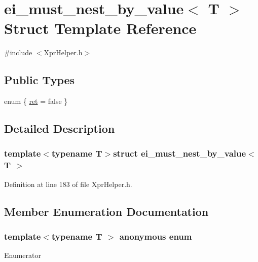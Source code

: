 \hypertarget{structei__must__nest__by__value}{\section{ei\-\_\-must\-\_\-nest\-\_\-by\-\_\-value$<$ T $>$ Struct Template Reference}
\label{structei__must__nest__by__value}
}


{\ttfamily \#include $<$Xpr\-Helper.\-h$>$}

\subsection*{Public Types}
\begin{DoxyCompactItemize}
\item 
enum \{ \hyperlink{structei__must__nest__by__value_a34fc76f821e8ac95bcee1b1a1439c056a6fc5ffc653a9a351bf712f7469e96b5c}{ret} = false
 \}
\end{DoxyCompactItemize}


\subsection{Detailed Description}
\subsubsection*{template$<$typename T$>$struct ei\-\_\-must\-\_\-nest\-\_\-by\-\_\-value$<$ T $>$}



Definition at line 183 of file Xpr\-Helper.\-h.



\subsection{Member Enumeration Documentation}
\hypertarget{structei__must__nest__by__value_a34fc76f821e8ac95bcee1b1a1439c056}{\subsubsection[{anonymous enum}]{\setlength{\rightskip}{0pt plus 5cm}template$<$typename T $>$ anonymous enum}}\label{structei__must__nest__by__value_a34fc76f821e8ac95bcee1b1a1439c056}
\begin{Desc}
\item[Enumerator]\par
\begin{description}
\item[{\em 
\hypertarget{structei__must__nest__by__value_a34fc76f821e8ac95bcee1b1a1439c056a6fc5ffc653a9a351bf712f7469e96b5c}{ret}\label{structei__must__nest__by__value_a34fc76f821e8ac95bcee1b1a1439c056a6fc5ffc653a9a351bf712f7469e96b5c}
}]\end{description}
\end{Desc}


